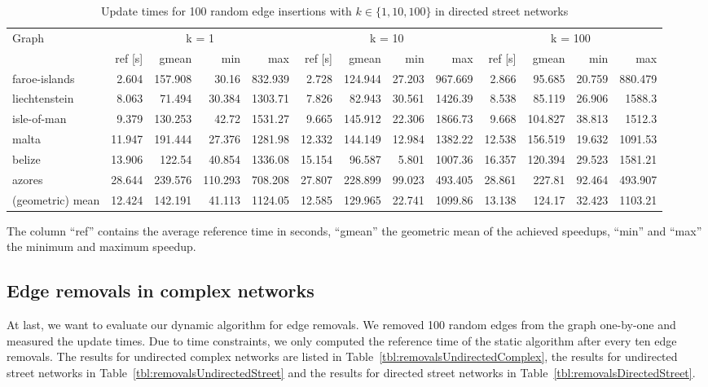\begin{landscape}
\begin{table}[h!]
\centering
\begin{tabular}{l|rrrr|rrrr|rrrr}
\toprule
Graph & \multicolumn{4}{c|}{k = 1} & \multicolumn{4}{c|}{k = 10} & \multicolumn{4}{c}{k = 100}\\
                &     ref [s] &   gmean &   min &     max &     ref [s] &   gmean &   min &     max &     ref [s] &   gmean &   min &     max \\
\midrule \midrule
 faroe-islands    &  2.604 & 157.908 &  30.16  &  832.939 &  2.728 & 124.944 & 27.203 &  967.669 &  2.866 &  95.685 & 20.759 &  880.479 \\
 liechtenstein    &  8.063 &  71.494 &  30.384 & 1303.71  &  7.826 &  82.943 & 30.561 & 1426.39  &  8.538 &  85.119 & 26.906 & 1588.3   \\
 isle-of-man      &  9.379 & 130.253 &  42.72  & 1531.27  &  9.665 & 145.912 & 22.306 & 1866.73  &  9.668 & 104.827 & 38.813 & 1512.3   \\
 malta            & 11.947 & 191.444 &  27.376 & 1281.98  & 12.332 & 144.149 & 12.984 & 1382.22  & 12.538 & 156.519 & 19.632 & 1091.53  \\
 belize           & 13.906 & 122.54  &  40.854 & 1336.08  & 15.154 &  96.587 &  5.801 & 1007.36  & 16.357 & 120.394 & 29.523 & 1581.21  \\
 azores           & 28.644 & 239.576 & 110.293 &  708.208 & 27.807 & 228.899 & 99.023 &  493.405 & 28.861 & 227.81  & 92.464 &  493.907 \\ \midrule \midrule
 (geometric) mean & 12.424 & 142.191 &  41.113 & 1124.05  & 12.585 & 129.965 & 22.741 & 1099.86  & 13.138 & 124.17  & 32.423 & 1103.21  \\
\bottomrule
\end{tabular}
\caption{Update times for 100 random edge insertions with  $k \in \{1, 10, 100\}$ in directed street networks}{The column ``ref'' contains the average reference time in seconds, ``gmean'' the geometric mean of the achieved speedups, ``min'' and ``max'' the minimum and maximum speedup.}
\label{tbl:resultsStreetNetworksDirected}
\end{table}

\end{landscape}

\subsection{Edge removals in complex networks}
At last, we want to evaluate our dynamic algorithm for edge removals. We removed 100 random edges from the graph one-by-one and measured the update times. Due to time constraints, we only computed the reference time of the static algorithm after every ten edge removals. The results for undirected complex networks are listed in Table~\ref{tbl:removalsUndirectedComplex}, the results for undirected street networks in Table~\ref{tbl:removalsUndirectedStreet} and the results for directed street networks in Table~\ref{tbl:removalsDirectedStreet}.

